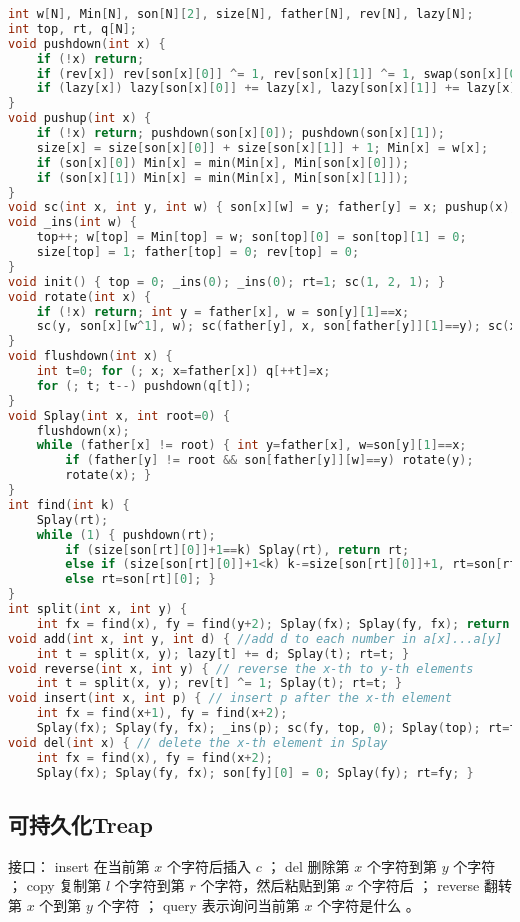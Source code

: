 \documentclass{article}
\begin{document}
\begin{lstlisting}[language=C++]
int w[N], Min[N], son[N][2], size[N], father[N], rev[N], lazy[N];
int top, rt, q[N];
void pushdown(int x) {
	if (!x) return;
	if (rev[x]) rev[son[x][0]] ^= 1, rev[son[x][1]] ^= 1, swap(son[x][0], son[x][1]), rev[x] = 0;
	if (lazy[x]) lazy[son[x][0]] += lazy[x], lazy[son[x][1]] += lazy[x], w[x] += lazy[x], Min[x] += lazy[x], lazy[x] = 0;
}
void pushup(int x) {
	if (!x) return; pushdown(son[x][0]); pushdown(son[x][1]);
	size[x] = size[son[x][0]] + size[son[x][1]] + 1; Min[x] = w[x];
	if (son[x][0]) Min[x] = min(Min[x], Min[son[x][0]]);
	if (son[x][1]) Min[x] = min(Min[x], Min[son[x][1]]);
}
void sc(int x, int y, int w) { son[x][w] = y; father[y] = x; pushup(x); }
void _ins(int w) {
	top++; w[top] = Min[top] = w; son[top][0] = son[top][1] = 0;
	size[top] = 1; father[top] = 0; rev[top] = 0;
}
void init() { top = 0; _ins(0); _ins(0); rt=1; sc(1, 2, 1); }
void rotate(int x) {
	if (!x) return; int y = father[x], w = son[y][1]==x;
	sc(y, son[x][w^1], w); sc(father[y], x, son[father[y]][1]==y); sc(x, y, w^1);
}
void flushdown(int x) {
	int t=0; for (; x; x=father[x]) q[++t]=x;
	for (; t; t--) pushdown(q[t]);
}
void Splay(int x, int root=0) {
	flushdown(x);
	while (father[x] != root) { int y=father[x], w=son[y][1]==x;
		if (father[y] != root && son[father[y]][w]==y) rotate(y);
		rotate(x); }
}
int find(int k) {
	Splay(rt);
	while (1) {	pushdown(rt);
		if (size[son[rt][0]]+1==k) Splay(rt), return rt;
		else if (size[son[rt][0]]+1<k) k-=size[son[rt][0]]+1, rt=son[rt][1];
		else rt=son[rt][0]; }
}
int split(int x, int y) {
	int fx = find(x), fy = find(y+2); Splay(fx); Splay(fy, fx); return son[fy][0]; }
void add(int x, int y, int d) { //add d to each number in a[x]...a[y]
	int t = split(x, y); lazy[t] += d; Splay(t); rt=t; }
void reverse(int x, int y) { // reverse the x-th to y-th elements
	int t = split(x, y); rev[t] ^= 1; Splay(t); rt=t; }
void insert(int x, int p) { // insert p after the x-th element
	int fx = find(x+1), fy = find(x+2);
	Splay(fx); Splay(fy, fx); _ins(p); sc(fy, top, 0); Splay(top); rt=top; }
void del(int x) { // delete the x-th element in Splay
	int fx = find(x), fy = find(x+2);
	Splay(fx); Splay(fy, fx); son[fy][0] = 0; Splay(fy); rt=fy; }
\end{lstlisting}

\subsection{可持久化Treap}
接口： 
 insert 在当前第 $x$ 个字符后插入 $c$ ；
 del 删除第 $x$ 个字符到第 $y$ 个字符 ；
 copy 复制第 $l$ 个字符到第 $r$ 个字符，然后粘贴到第 $x$ 个字符后 ；
 reverse 翻转第 $x$ 个到第 $y$ 个字符 ；
 query 表示询问当前第 $x$ 个字符是什么 。
\end{document}
